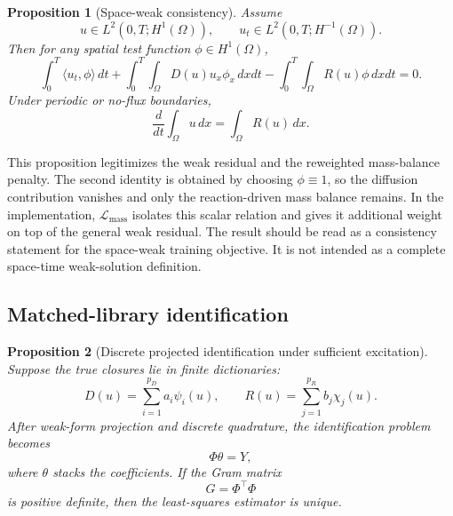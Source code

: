 \documentclass[preprint,12pt]{elsarticle}
\newtheorem{proposition}{Proposition}
\begin{document}
\begin{proposition}[Space-weak consistency]
Assume
\begin{equation}
u \in L^2(0,T;H^1(\Omega)),
\qquad
u_t \in L^2(0,T;H^{-1}(\Omega)).
\end{equation}
Then for any spatial test function $\phi \in H^1(\Omega)$,
\begin{equation}
\int_0^T \langle u_t,\phi \rangle \, dt
+ \int_0^T \int_\Omega D(u) u_x \phi_x \, dx dt
- \int_0^T \int_\Omega R(u) \phi \, dx dt
= 0.
\end{equation}
Under periodic or no-flux boundaries,
\begin{equation}
\frac{d}{dt} \int_\Omega u \, dx = \int_\Omega R(u) \, dx.
\end{equation}
\end{proposition}

This proposition legitimizes the weak residual and the reweighted mass-balance penalty. The second identity is obtained by choosing $\phi \equiv 1$, so the diffusion contribution vanishes and only the reaction-driven mass balance remains. In the implementation, $\mathcal{L}_{\text{mass}}$ isolates this scalar relation and gives it additional weight on top of the general weak residual. The result should be read as a consistency statement for the space-weak training objective. It is not intended as a complete space-time weak-solution definition.

\subsection{Matched-library identification}

\begin{proposition}[Discrete projected identification under sufficient excitation]
Suppose the true closures lie in finite dictionaries:
\begin{equation}
D(u) = \sum_{i=1}^{p_D} a_i \psi_i(u),
\qquad
R(u) = \sum_{j=1}^{p_R} b_j \chi_j(u).
\end{equation}
After weak-form projection and discrete quadrature, the identification problem becomes
\begin{equation}
\Phi \theta = Y,
\end{equation}
where $\theta$ stacks the coefficients. If the Gram matrix
\begin{equation}
G = \Phi^\top \Phi
\end{equation}
is positive definite, then the least-squares estimator is unique.
\end{proposition}
\end{document}
